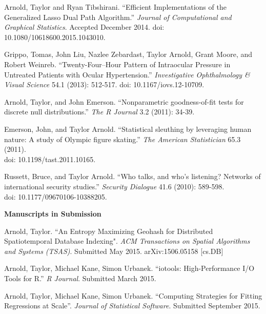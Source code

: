 \documentclass[12pt]{article}
\newcommand{\years}[1]{\marginnote{\scriptsize #1}} %
\begin{document}
\years{2014}Arnold, Taylor and Ryan Tibshirani. “Efficient Implementations of the Generalized Lasso Dual Path Algorithm.” {\it Journal of Computational and Graphical Statistics}. Accepted December 2014. doi: 10.1080/10618600.2015.1043010. \vspace{0.25cm}

\years{2013}Grippo, Tomas, John Liu, Nazlee Zebardast, Taylor Arnold, Grant Moore, and Robert Weinreb. “Twenty-Four–Hour Pattern of Intraocular Pressure in Untreated Patients with Ocular Hypertension.” {\it Investigative Ophthalmology \& Visual Science} 54.1 (2013): 512-517. doi: 10.1167/iovs.12-10709. \vspace{0.25cm}

\years{2011}Arnold, Taylor, and John Emerson. “Nonparametric goodness-of-fit tests for discrete null distributions.” {\it The R Journal} 3.2 (2011): 34-39. \vspace{0.25cm}

\years{2011}Emerson, John, and Taylor  Arnold. “Statistical sleuthing by leveraging human nature: A study of Olympic figure skating.” {\it The American Statistician} 65.3 (2011).\\doi: 10.1198/tast.2011.10165. \vspace{0.25cm}

\years{2010}Russett, Bruce, and Taylor Arnold. “Who talks, and who’s listening? Networks of international security studies.” {\it Security Dialogue} 41.6 (2010): 589-598.\\doi: 10.1177/09670106-10388205. \vspace{0.25cm}

\vspace{12pt}
{\bf Manuscripts in Submission}
\vspace{12pt}

\years{2015}Arnold, Taylor. “An Entropy Maximizing Geohash for Distributed Spatiotemporal Database Indexing". {\it ACM Transactions on Spatial Algorithms and Systems (TSAS)}. Submitted May 2015. arXiv:1506.05158 [cs.DB] \vspace{0.25cm}

\years{2015}Arnold, Taylor, Michael Kane, Simon Urbanek. “iotools: High-Performance I/O Tools for R.” {\it R Journal}. Submitted March 2015. \vspace{0.25cm}

\years{2015} Arnold, Taylor, Michael Kane, Simon Urbanek. “Computing Strategies for Fitting Regressions at Scale”. {\it Journal of Statistical Software}.  Submitted September 2015. \vspace{0.25cm}
\end{document}
